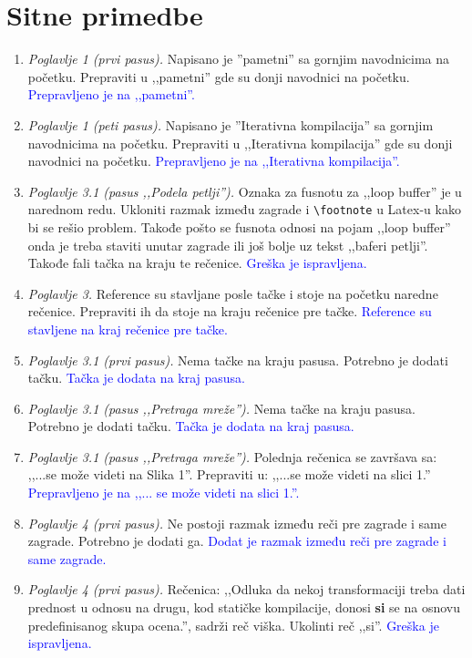 \documentclass[a4paper]{report}
\newcommand{\odgovor}[1]{\textcolor{blue}{#1}}
\begin{document}
\section{Sitne primedbe}
\begin{enumerate}
	\item \textit{Poglavlje 1 (prvi pasus).} Napisano je ''pametni'' sa gornjim navodnicima na početku. Prepraviti u ,,pametni'' gde su donji navodnici na početku.
	      \odgovor{ Prepravljeno je na ,,pametni''.}
	\item \textit{Poglavlje 1 (peti pasus).} Napisano je ''Iterativna kompilacija'' sa gornjim navodnicima na početku. Prepraviti u ,,Iterativna kompilacija'' gde su donji navodnici na početku.
		  \odgovor{ Prepravljeno je na ,,Iterativna kompilacija''.}
	\item \textit{Poglavlje 3.1 (pasus ,,Podela petlji'').} Oznaka za fusnotu za ,,loop buffer'' je u narednom redu. Ukloniti razmak između zagrade i \verb!\footnote! u Latex-u kako bi se rešio problem. Takođe pošto se fusnota odnosi na pojam ,,loop buffer'' onda je treba staviti unutar zagrade ili još bolje uz tekst ,,baferi petlji''. Takođe fali tačka na kraju te rečenice.
		  \odgovor{ Greška je ispravljena. }
	\item \textit{Poglavlje 3.} Reference su stavljane posle tačke i stoje na početku naredne rečenice. Prepraviti ih da stoje na kraju rečenice pre tačke.
	      \odgovor{ Reference su stavljene na kraj rečenice pre tačke. }
	\item \textit{Poglavlje 3.1 (prvi pasus).} Nema tačke na kraju pasusa. Potrebno je dodati tačku.
		  \odgovor{ Tačka je dodata na kraj pasusa. }
	\item \textit{Poglavlje 3.1 (pasus ,,Pretraga mreže'').} Nema tačke na kraju pasusa. Potrebno je dodati tačku.
		  \odgovor{ Tačka je dodata na kraj pasusa. }
	\item \textit{Poglavlje 3.1 (pasus ,,Pretraga mreže'').} Polednja rečenica se završava sa: ,,...se može videti na Slika 1''. Prepraviti u: ,,...se može videti na slici 1.''
	      \odgovor{ Prepravljeno je na ,,... se može videti na slici 1.''.}
	\item \textit{Poglavlje 4 (prvi pasus).} Ne postoji razmak između reči pre zagrade i same zagrade. Potrebno je dodati ga.
          \odgovor{ Dodat je razmak između reči pre zagrade i same zagrade. }
	\item \textit{Poglavlje 4 (prvi pasus).} Rečenica: ,,Odluka da nekoj transformaciji treba dati prednost u odnosu na drugu, kod statičke kompilacije, donosi \textbf{si} se na osnovu predefinisanog skupa ocena.'', sadrži reč viška. Ukolinti reč ,,si''.
		  \odgovor{ Greška je ispravljena. }
\end{enumerate}
\end{document}
